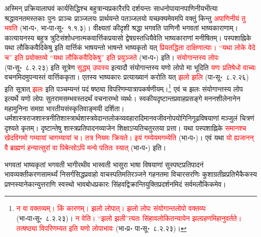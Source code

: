 \begin{sloppypar}\justifying\noindent\hspace{10mm} अस्मिन् प्रक्रिया\-लाघवं कार्य\-सिद्धिश्च बहुत्रान्य\-प्रकारैरपि दर्शयन्तः साधनोपायानपाणिनीय\-भीत्या श्रद्धावनत\-मस्तकाः पुनः प्राञ्चः प्राञ्जलयः प्रार्थयन्ते पतञ्जलयो यच्छक्यमेवमपि वक्तुं किन्तु \textcolor{red}{अपाणिनीयं तु भवति} (भा॰प॰, भा॰पा॰सू॰~१.१.३)। वीक्ष्यतां कीदृशी श्रद्धा भगवति पाणिनौ भगवतां भाष्यकाराणाम्। कात्यायनस्य बहुत्र त्रुटि\-संशोधनात्मक\-वार्त्तिक\-प्रयासो द्वेष\-ग्रस्त\-धियैवेति भाष्यकाराणां मनीषितम्। पस्पशाह्निके यथा लौकिकवैदिकेषु इति वार्त्तिकं भाषयन्तो भाषन्ते भाष्यकृतो यत् \textcolor{red}{प्रिय\-तद्धिता दाक्षिणात्याः। “यथा लोके वेदे च” इति प्रयोक्तव्ये “यथा लौकिक\-वैदिकेषु” इति प्रयुञ्जते} (भा॰प॰) इति। \textcolor{red}{संयोगान्तस्य लोपः} (पा॰सू॰~८.२.२३) इति सूत्रेण \textcolor{red}{सुद्ध्य् उपास्य} इत्यादौ संयोगान्तस्य यणो लोपो मा भूदिति \textcolor{red}{यणः प्रतिषेधो वाच्यः} वचनमिदमुपन्यस्तं वार्त्तिक\-कृता। एतस्य भाष्यकारः प्रत्याख्यानं करोति यत् \textcolor{red}{झलो झलि} (पा॰सू॰~८.२.२६) इति सूत्रात् \textcolor{red}{झलः} इति पञ्चम्यन्तं पदं षष्ठ्या विपरिणम्यात्राप\-कर्षणीयम्।\footnote{\textcolor{red}{न वा वक्तव्यम्। किं कारणम्। झलो लोपात्। झलो लोपः संयोगान्त\-लोपो वक्तव्यः} (भा॰पा॰सू॰~८.२.२३)। \textcolor{red}{न वेति। “झलो झली”त्यतः सिंहाव\-लोकित\-न्यायेन झल्ग्रहणमिहानु\-वर्तते। तत्षष्ठ्या विपरिणम्यत इति यणो लोपाभावः} (भा॰प्र॰ पा॰सू॰~८.२.२३)।} एवं च झलः संयोगान्तस्य लोप इत्यर्थे यणो लोपः सुतरामसम्भवस्तदर्थं वचनारम्भो व्यर्थः। स्वकीय\-दृष्टान्त\-प्रवाह\-प्रसङ्गे मनन\-शीलेनानेन महा\-मुनिना समग्रा भारतीय\-संस्कृति\-वाङ्मयी दर्शिता। धर्मशास्त्र\-राजशास्त्र\-नीतिशास्त्रार्थशास्त्र\-वेदान्त\-लोक\-व्यवहारादि\-मानव\-जीवनोपयोगि\-निगूढ\-विषयाणां मञ्जुलं चित्रणं दृश्यते कृतम्। दृष्टान्तेषु शास्त्र\-प्रतिपादन\-व्याजेन शिक्षाऽप्यतिचतुरतया प्रत्ता। यथा पस्पशाह्निके \textcolor{red}{समानश्च खेद\-विगमो गम्यायां चागम्यायां च। तत्र नियमः क्रियते। इयं गम्येयमगम्येति} (भा॰प॰)। एवं यथा \textcolor{red}{यो ह्यजानन् वै ब्राह्मणं हन्यात्सुरां वा पिबेत्सोऽपि मन्ये पतितः स्यात्} (भा॰प॰) इति।\end{sloppypar}
\begin{sloppypar}\justifying\noindent\hspace{10mm} भगवतां भाष्यकृतां भगवती भागीरथीव भास्वती भासुरा भाषा विषयाणां सुस्पष्ट\-प्रतिपादनं भाव\-व्यक्तीकरण\-सामर्थ्यं निसर्ग\-सिद्ध\-प्रवाहो वाचस्पति\-मति\-रञ्जने गहनतमा विचार\-सरणिः कुशाग्र\-तीव्र\-प्रतिभैकैकस्य प्रश्नस्यानेकान्युत्तराणि स्वस्थो भाव\-बोध\-प्रकारः सिंहवद्विक्रान्ति\-युक्ति\-प्रदर्शनमिदं सर्वमलौकिकमेव।\end{sloppypar}
